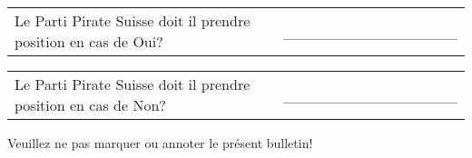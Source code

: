\documentclass[11pt, a4paper]{scrartcl}
\begin{document}
{\begin{minipage}[t][12.5cm][t]{17.7cm}
\vspace{0.5cm}

\begin{tabular}{ b{13.5cm} b{3cm} }
Le Parti Pirate Suisse doit il prendre position en cas de Oui?
& \_\_\_\_\_\_\_\_\_\_\_\_\_\_\_\_ \\
\end{tabular}

\vspace{0.5cm}

\begin{tabular}{ b{13.5cm} b{3cm} }
Le Parti Pirate Suisse doit il prendre position en cas de Non?
& \_\_\_\_\_\_\_\_\_\_\_\_\_\_\_\_ \\
\end{tabular}

\vspace{0.5cm}

Veuillez ne pas marquer ou annoter le présent bulletin!


\end{minipage}


}
\end{document}
